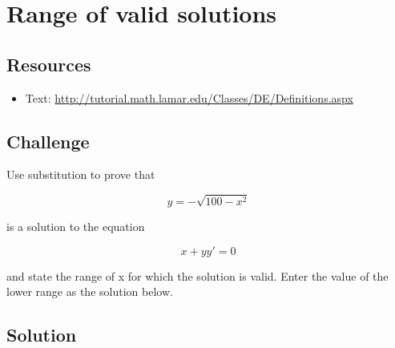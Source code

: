 



\newpage

\section{Range of valid solutions}

\subsection*{Resources}
\begin{itemize}
    \item Text: \url{http://tutorial.math.lamar.edu/Classes/DE/Definitions.aspx}
\end{itemize}

\subsection*{Challenge}

Use substitution to prove that

\begin{equation}
    y = -\sqrt{100-x^2}
\end{equation}

is a solution to the equation

\begin{equation}
    x + y y' = 0
\end{equation}

and state the range of x for which the solution is valid. Enter the value of the lower range as the solution below.

\subsection*{Solution}
